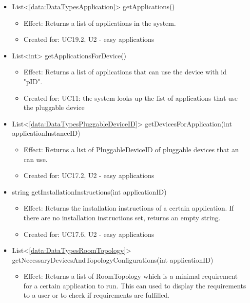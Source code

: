 \begin{description}
\begin{itemize}[noitemsep,nolistsep,leftmargin=-.25cm]
\begin{itemize}
        \end{itemize}
      \item \textsf{List\textless{}\ref{data:DataTypesApplication}\textgreater{} getApplications()}
        \begin{itemize}[noitemsep,nolistsep]
           \item Effect: Returns a list of applications in the system.
\item Created for: UC19.2, U2 - easy applications
        \end{itemize}
      \item \textsf{List\textless{}int\textgreater{} getApplicationsForDevice()}
        \begin{itemize}[noitemsep,nolistsep]
           \item Effect: Returns a list of applications that can use the device with id "pID".
\item Created for: UC11: the system looks up the list of applications that use the pluggable device
        \end{itemize}
      \item \textsf{List\textless{}\ref{data:DataTypesPluggableDeviceID}\textgreater{} getDevicesForApplication(int applicationInstanceID)}
        \begin{itemize}[noitemsep,nolistsep]
           \item Effect: Returns a list of PluggableDeviceID of pluggable devices that an  can use.
\item Created for: UC17.2, U2 - easy applications
        \end{itemize}
      \item \textsf{string getInstallationInstructions(int applicationID)}
        \begin{itemize}[noitemsep,nolistsep]
           \item Effect: Returns the installation instructions of a certain application. If there are no installation instructions set, returns an empty string.
\item Created for: UC17.6, U2 - easy applications
        \end{itemize}
      \item \textsf{List\textless{}\ref{data:DataTypesRoomTopology}\textgreater{} getNecessaryDevicesAndTopologyConfigurations(int applicationID)}
        \begin{itemize}[noitemsep,nolistsep]
           \item Effect: Returns a list of RoomTopology which is a minimal requirement for a certain application to run. This can used to display the requirements to a user or to check if requirements are fulfilled.

\end{itemize}
\end{itemize}
\end{description}
